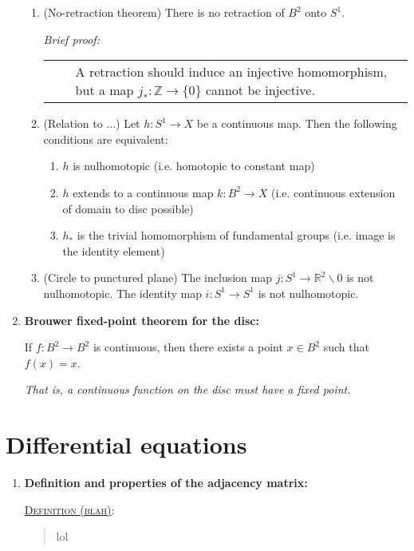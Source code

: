 \documentclass[letterpaper, 12pt]{article}
\newcommand{\RR}{\mathbb{R}}
\newcommand{\ZZ}{\mathbb{Z}}
\newcommand{\defn}[2]{\textsc{\underline{Definition (#1)}:}\begin{quote} #2\end{quote}}
\newenvironment{briefproof}{\footnotesize\begin{flushleft}\textit{Brief proof:}\par\begin{tabular}{l|p{0.8\textwidth}}$\quad$&}{\\
    \end{tabular}\end{flushleft}}
\begin{document}
\begin{enumerate}[resume]
\begin{enumerate}
            \item (No-retraction theorem) There is no retraction of $B^2$ onto $S^1$.
                \begin{briefproof}
                A retraction should induce an injective homomorphism, but a map $j_* : \ZZ \to \{0\}$ cannot be injective.
                \end{briefproof}
            \item (Relation to ...) Let $h:S^1\to X$ be a continuous map. Then the following conditions are equivalent: %
                \begin{enumerate}
                \item $h$ is nulhomotopic (i.e. homotopic to constant map)
                \item $h$ extends to a continuous map $k:B^2\to X$ (i.e. continuous extension of domain to disc possible)
                \item $h_*$ is the trivial homomorphism of fundamental groups (i.e. image is the identity element)
                \end{enumerate}
            \item (Circle to punctured plane) The inclusion map $j : S^1 \to \RR^2\smallsetminus 0$ is not nulhomotopic. The identity map $i:S^1\to S^1$ is not nulhomotopic.
            \end{enumerate}
        \item \textbf{Brouwer fixed-point theorem for the disc:}

            If $f:B^2\to B^2$ is continuous, then there exists a point $x\in B^2$ such that $f(x) = x$.

            \textit{That is, a continuous function on the disc must have a fixed point.}
        \end{enumerate}

\section{Differential equations}
    \begin{enumerate}[resume]
    \item \textbf{Definition and properties of the adjacency matrix:}

        \defn{blah}{lol}
    \end{enumerate}
\end{document}
